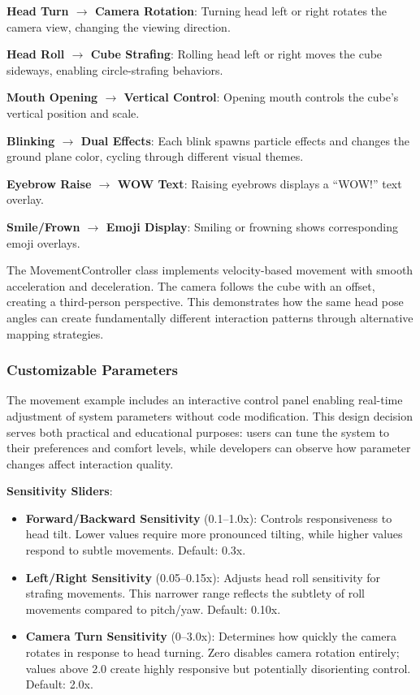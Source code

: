 \documentclass[sigconf]{acmart}
\begin{document}
\textbf{Head Turn $\rightarrow$ Camera Rotation}: Turning head left or right rotates the camera view, changing the viewing direction.

\textbf{Head Roll $\rightarrow$ Cube Strafing}: Rolling head left or right moves the cube sideways, enabling circle-strafing behaviors.

\textbf{Mouth Opening $\rightarrow$ Vertical Control}: Opening mouth controls the cube's vertical position and scale.

\textbf{Blinking $\rightarrow$ Dual Effects}: Each blink spawns particle effects and changes the ground plane color, cycling through different visual themes.

\textbf{Eyebrow Raise $\rightarrow$ WOW Text}: Raising eyebrows displays a ``WOW!'' text overlay.

\textbf{Smile/Frown $\rightarrow$ Emoji Display}: Smiling or frowning shows corresponding emoji overlays.

The MovementController class implements velocity-based movement with smooth acceleration and deceleration. The camera follows the cube with an offset, creating a third-person perspective. This demonstrates how the same head pose angles can create fundamentally different interaction patterns through alternative mapping strategies.

\subsubsection{Customizable Parameters}

The movement example includes an interactive control panel enabling real-time adjustment of system parameters without code modification. This design decision serves both practical and educational purposes: users can tune the system to their preferences and comfort levels, while developers can observe how parameter changes affect interaction quality.

\textbf{Sensitivity Sliders}:
\begin{itemize}
\item \textbf{Forward/Backward Sensitivity} (0.1--1.0x): Controls responsiveness to head tilt. Lower values require more pronounced tilting, while higher values respond to subtle movements. Default: 0.3x.
\item \textbf{Left/Right Sensitivity} (0.05--0.15x): Adjusts head roll sensitivity for strafing movements. This narrower range reflects the subtlety of roll movements compared to pitch/yaw. Default: 0.10x.
\item \textbf{Camera Turn Sensitivity} (0--3.0x): Determines how quickly the camera rotates in response to head turning. Zero disables camera rotation entirely; values above 2.0 create highly responsive but potentially disorienting control. Default: 2.0x.
\end{itemize}
\end{document}
